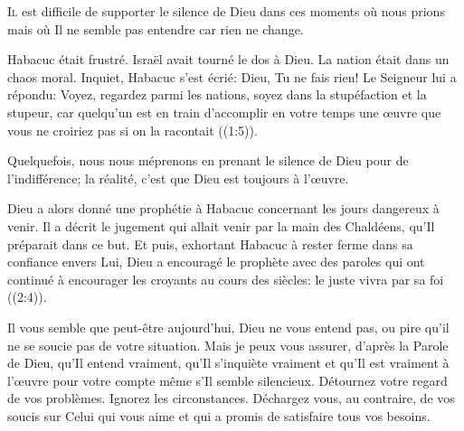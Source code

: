


\lettrine{I}{l} est difficile de supporter le silence de Dieu
 \ocadr dans ces moments où nous prions mais où Il ne semble pas
 entendre car rien ne change. 

Habacuc était frustré. Israël avait tourné le dos à Dieu.
 La nation était dans un chaos moral.
 Inquiet, Habacuc s'est écrié: 
 \Og Dieu, Tu ne fais rien! \Fg{} 
 Le Seigneur lui a répondu: \Og Voyez, regardez parmi les nations,
 soyez dans la stupéfaction et la stupeur, car quelqu'un est en train
 d'accomplir en votre temps une \oe{}uvre que vous ne croiriez pas
 si on la racontait \Fg{} ((1:5)).


Quelquefois, nous nous méprenons en prenant le silence de Dieu
 pour de l'indifférence; la réalité, c'est que Dieu est toujours à l'\oe{}uvre. 

Dieu a alors donné une prophétie à Habacuc concernant les jours dangereux
 à venir. Il a décrit le jugement qui allait venir par la main des Chaldéens,
 qu'Il préparait dans ce but. Et puis, exhortant Habacuc à rester ferme
 dans sa confiance envers Lui, Dieu a encouragé le prophète avec des paroles
 qui ont continué à encourager les croyants au cours des siècles:
 \Og le juste vivra par sa foi \Fg{} ((2:4)). 

Il vous semble que peut-être aujourd'hui, Dieu ne vous entend pas, ou pire
 \ocadr qu'il ne se soucie pas de votre situation. Mais je peux vous assurer,
 d'après la Parole de Dieu, qu'Il entend vraiment,
 qu'Il s'inquiète vraiment et qu'Il est vraiment à l'\oe{}uvre pour votre compte
 \ocadr même s'Il semble silencieux. Détournez votre regard de vos problèmes.
 Ignorez les circonstances. Déchargez vous, au contraire, de vos soucis
 sur Celui qui vous aime et qui a promis de satisfaire tous vos besoins. 

\dvrule



